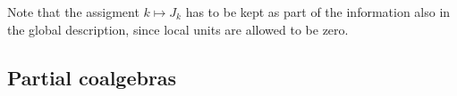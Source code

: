 \begin{Rem}%
Note that the assigment $k\mapsto J_k$ has to be kept as part of the information also in the global description, since local units are allowed to be zero. 
\end{Rem}


\subsection{Partial coalgebras}




